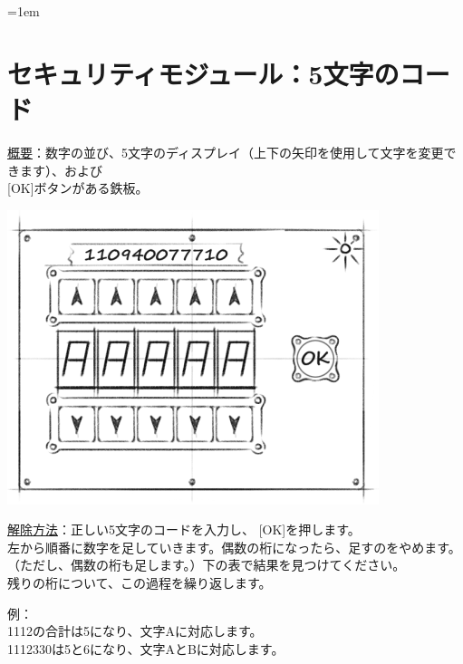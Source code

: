 \begin{minipage}{0.63\textwidth}
    \parskip=1em
    \section*{セキュリティモジュール：5文字のコード}
    
    \uline{概要}：数字の並び{、}5文字のディスプレイ（上下の矢印を使用して文字を変更できます）{、}および\hfill\\{[OK]}ボタンがある鉄板。
\end{minipage}%
\hfill%
\begin{minipage}{0.33\textwidth}
    \includegraphics[width=\textwidth]{images/9.png}
    \vspace*{\fill}
\end{minipage}

\uline{解除方法}：正しい5文字のコードを入力し{、} {[OK]}を押します。\\
左から順番に数字を足していきます。偶数の桁になったら{、}足すのをやめます。（ただし{、}偶数の桁も足します。）下の表で結果を見つけてください。\\
残りの桁について{、}この過程を繰り返します。

例：\\
\hspace*{3em}1112の合計は5になり、文字Aに対応します。\\
\hspace*{3em}1112330は5と6になり、文字AとBに対応します。


